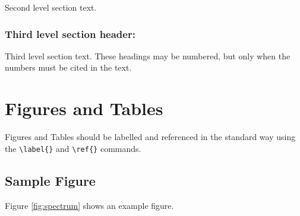 \documentclass[9pt,twocolumn,twoside]{g3_article/gsag3jnl}
\begin{document}
Second level section text.

\subsubsection*{Third level section header:}

Third level section text. These headings may be numbered, but only when the numbers must be cited in the text. 

\section*{Figures and Tables}

Figures and Tables should be labelled and referenced in the standard way using the \verb|\label{}| and \verb|\ref{}| commands.

\subsection*{Sample Figure}

Figure \ref{fig:spectrum} shows an example figure.
\end{document}
